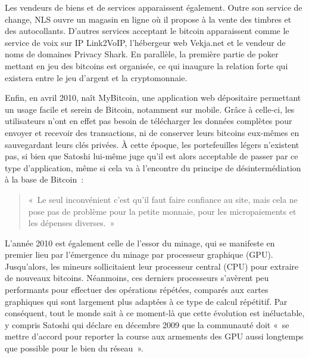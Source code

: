 Les vendeurs de biens et de services apparaissent également. Outre son service de change, NLS ouvre un magasin en ligne où il propose à la vente des timbres et des autocollants. D'autres services acceptant le bitcoin apparaissent comme le service de voix sur IP Link2VoIP, l'hébergeur web Vekja.net et le vendeur de noms de domaines Privacy Shark. En parallèle, la première partie de poker mettant en jeu des bitcoins est organisée, ce qui inaugure la relation forte qui existera entre le jeu d'argent et la cryptomonnaie.

Enfin, en avril 2010, naît MyBitcoin, une application web dépositaire permettant un usage facile et serein de Bitcoin, notamment sur mobile. Grâce à celle-ci, les utilisateurs n'ont en effet pas besoin de télécharger les données complètes pour envoyer et recevoir des transactions, ni de conserver leurs bitcoins eux-mêmes en sauvegardant leurs clés privées. À cette époque, les portefeuilles légers n'existent pas, si bien que Satoshi lui-même juge qu'il est alors acceptable de passer par ce type d'application, même si cela va à l'encontre du principe de désintermédiation à la base de Bitcoin~:

\begin{quote}
«~Le seul inconvénient c'est qu'il faut faire confiance au site, mais cela ne pose pas de problème pour la petite monnaie, pour les micropaiements et les dépenses diverses.~»
\end{quote}


L'année 2010 est également celle de l'essor du minage, qui se manifeste en premier lieu par l'émergence du minage par processeur graphique (GPU). Jusqu'alors, les mineurs sollicitaient leur processeur central (CPU) pour extraire de nouveaux bitcoins. Néanmoins, ces derniers processeurs s'avèrent peu performants pour effectuer des opérations répétées, comparés aux cartes graphiques qui sont largement plus adaptées à ce type de calcul répétitif. Par conséquent, tout le monde sait à ce moment-là que cette évolution est inéluctable, y compris Satoshi qui déclare en décembre 2009 que la communauté doit «~se mettre d'accord pour reporter la course aux armements des GPU aussi longtemps que possible pour le bien du réseau~».

